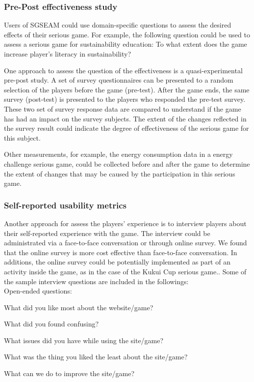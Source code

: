 \documentclass[11pt]{article}
\begin{document}
\subsubsection{Pre-Post effectiveness study}
\label{Pre Post effectiveness study}

Users of SGSEAM could use domain-specific questions to assess the desired effects of their
serious game. For example, the following question could be used to assess a serious
game for sustainability education: To what extent does the game increase player's literacy in
sustainability? 

One approach to assess the question of the effectiveness is a quasi-experimental pre-post
study. A set of survey questionnaires can be presented to a random selection of the players
before the game (pre-test). After the game ends, the same survey (post-test) is presented to the
players who responded the pre-test survey. These two set of survey response data are compared to
understand if the game has had an impact on the survey subjects. The extent of the changes reflected in the survey result could indicate the degree of effectiveness of the serious game for this subject.

Other measurements, for example, the energy consumption data in a energy challenge serious game, could be collected before and after the game to determine the extent of changes that may be caused by the participation in this serious game.

\subsubsection{Self-reported usability metrics}
\label{Self-reported usability metrics}

Another approach for assess the players' experience is to interview players about their self-reported
experience with the game. The interview could be administrated via a face-to-face conversation or through 
online survey. We found that the online survey is more cost effective than face-to-face conversation. 
In additions, the online survey could be potentially implemented as part of an activity inside the game, 
as in the case of the Kukui Cup serious game.\cite{csdl2-10-08}. Some of the sample interview questions are included in the followings:\\

Open-ended questions: 
\begin{compactitem}
\item What did you like most about the website/game?
\item What did you found confusing?
\item What issues did you have while using the site/game?
\item What was the thing you liked the least about the site/game?
\item What can we do to improve the site/game?\\
\end{compactitem}
\end{document}
